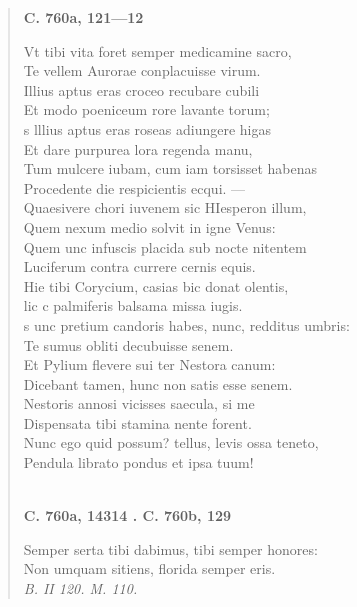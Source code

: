 \documentclass[11pt, a4paper]{report}
\begin{document}
\begin{verse}
    \begin{center} \textbf{C. 760a, 121—12} \end{center} \marginpar{[04]}  \marginpar{[241]} Vt tibi vita foret semper medicamine sacro, \\ Te vellem Aurorae conplacuisse virum. \\ Illius aptus eras croceo recubare cubili \\ Et modo poeniceum rore lavante torum; \\ s lllius aptus eras roseas adiungere higas \\ Et dare purpurea lora regenda manu, \\ Tum mulcere iubam, cum iam torsisset habenas \\ Procedente die respicientis ecqui. — \\ Quaesivere chori iuvenem sic HIesperon illum, \\ Quem nexum medio solvit in igne Venus: \\ Quem unc infuscis placida sub nocte nitentem \\ Luciferum contra currere cernis equis. \\ Hie tibi Corycium, casias bic donat olentis, \\ lic c palmiferis balsama missa iugis. \\ s unc pretium candoris habes, nunc, redditus umbris: \\ Te sumus obliti decubuisse senem. \\ Et Pylium flevere sui ter Nestora canum: \\ Dicebant tamen, hunc non satis esse senem. \\ Nestoris annosi vicisses saecula, si me \\ Dispensata tibi stamina nente forent. \\ Nunc ego quid possum? tellus, levis ossa teneto, \\ Pendula librato pondus et ipsa tuum! \\ 
        ﻿\pagebreak 
    \begin{center} \textbf{C. 760a, 14314 . C. 760b, 129} \end{center} \marginpar{[242]} Semper serta tibi dabimus, tibi semper honores: \\ Non umquam sitiens, florida semper eris. \\ \textit{B. II 120. M. 110.} \\ 
      \end{verse}
  
\end{document}
